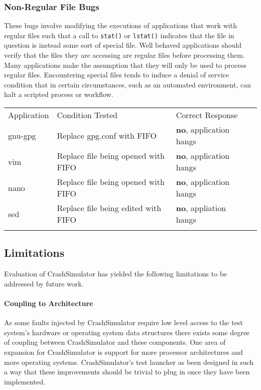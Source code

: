         \subsubsection{Non-Regular File Bugs}

        These bugs involve modifying the executions of applications that work with regular files such that a call to
        {\tt stat()} or {\tt lstat()} indicates that the file in question is instead some sort of special file.  Well behaved
        applications should verify that the files they are accessing are regular files before processing them.  Many
        applications make the assumption that they will only be used to process regular files.  Encountering special
        files tends to induce a denial of service condition that in certain circumstances, such as an automated
        environment, can halt a scripted process or workflow.

            \begin{table}[H]
                \scriptsize{}
                \begin{tabular}{l  l  l  l}
                \toprule{}
                  Application & Condition Tested & Correct Response\\
                  gnu-gpg & Replace gpg.conf with FIFO & \textbf{no}, application hangs\\
                  vim & Replace file being opened with FIFO & \textbf{no}, application hangs\\
                  nano & Replace file being opened with FIFO & \textbf{no}, application hangs\\
                  sed & Replace file being edited with FIFO & \textbf{no}, appliation hangs\\
                \bottomrule{}
                \end{tabular}
            \end{table}
        
        
        

    \subsection{Limitations}

        Evaluation of CrashSimulator has yielded the following limitations to be addressed by future work.

        \paragraph{Coupling to Architecture}

            As some faults injected by CrashSimulator require low level access to the test system's hardware or
            operating system data structures there exists some degree of coupling between CrashSimulator and these
            components. One area of expansion for CrashSimulator is support for more processor architectures and more
            operating systems.  CrashSimulator's test launcher as been designed in such a way that these improvements
            should be trivial to plug in once they have been implemented.

